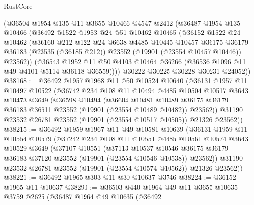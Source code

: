 \begin{lexlean}{RustCore}
\begin{coremodule}
      (@36504
        @1954
        @135
        @11
        @3655
        @10466
        @4547
        @2412
        (@36487
          @1954
          @135
          @10466
          (@36492
            @1522
            @1953
            @24
            @51
            @10462
            @10465
            (@36152
              @1522
              @24
              @10462
              (@36160
                @212
                @122
                @24
                @6638
                @4485
                @10445
                @10457
                @36175
                @36179
                @36183
                (@23535 (@36185 @212))
                @23552
                (@19901 (@23554 @10457 @10446))
                @23562))
            (@36543
              @1952
              @11
              @50
              @4103
              @10464
              @36266
              (@36536 @1096 @11 @49 @4101 @5114 @36118 @36559))))
        @30222
        @30225
        @30228
        @30231
        @24052))
@38168 := @36492
    @1957
    @1968
    @11
    @50
    @10524
    @10640
    (@36131
      @1957
      @11
      @10497
      @10522
      (@36742
        @234
        @108
        @11
        @10494
        @4485
        @10504
        @10517
        @3643
        @10473
        @3649
        (@36598
          @10494
          (@36604
            @10481
            @10489
            @36175
            @36179
            @36183
            @36611
            @23552
            (@19901 (@23554 @10489 @10482))
            @23562))
        @31190
        @23532
        @26781
        @23552
        (@19901 (@23554 @10517 @10505))
        @21326
        @23562))
@38215 := @36492
    @1959
    @1967
    @11
    @49
    @10581
    @10639
    (@36131
      @1959
      @11
      @10554
      @10579
      (@37242
        @234
        @108
        @11
        @10551
        @4485
        @10561
        @10574
        @3643
        @10529
        @3649
        (@37107
          @10551
          (@37113
            @10537
            @10546
            @36175
            @36179
            @36183
            @37120
            @23552
            (@19901 (@23554 @10546 @10538))
            @23562))
        @31190
        @23532
        @26781
        @23552
        (@19901 (@23554 @10574 @10562))
        @21326
        @23562))
@38221 := @36492 @1965 @303 @11 @30 @10637 @3746
@38224 := @36152 @1965 @11 @10637
@38290 := @36503
    @440
    @1964
    @49
    @11
    @3655
    @10635
    @3759
    @2625
    (@36487
      @1964
      @49
      @10635
      (@36492

\end{coremodule}
\end{lexlean}
